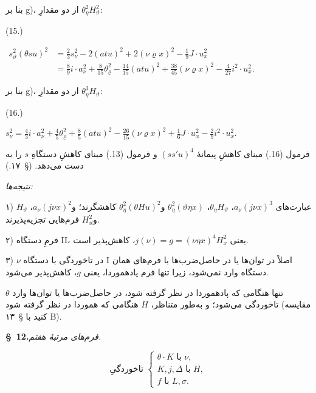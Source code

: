 \documentclass[11pt]{article}
\providecommand{\A}{\Delta}
\begin{document}
بنا بر g)، از دو مقدارِ $\theta_\eta^2H_\vartheta^2$:
\par\smallskip\noindent
\begin{minipage}[c]{3.6em}
\centering (15.)
\end{minipage}%
\begin{minipage}[c]{\dimexpr\linewidth-3.6em\relax}
\centering
\(\displaystyle
\begin{aligned}
s_\vartheta^2(\theta su)^2
&=\frac23s_\nu^2-2(atu)^2+2(\nu\varrho x)^2-\frac19J\cdot u_x^2\\
&=\frac89i\cdot a_\nu^2+\frac8{15}\theta_\varrho^2-\frac{14}{15}(atu)^2+\frac{38}{45}(\nu\varrho x)^2-\frac4{27}i^2\cdot u_x^2.
\end{aligned}
\)
\end{minipage}
\par\smallskip
بنا بر g)، از دو مقدارِ $\theta_\eta^3H_\vartheta$:
\par\smallskip\noindent
\begin{minipage}[c]{3.6em}
\centering (16.)
\end{minipage}%
\begin{minipage}[c]{\dimexpr\linewidth-3.6em\relax}
\centering
\(\displaystyle
s_\nu^2=\frac43i\cdot a_\nu^2+\frac45\theta_\varrho^2+\frac85(atu)^2-\frac{26}{15}(\nu\varrho x)^2+\frac16J\cdot u_x^2-\frac29i^2\cdot u_x^2.
\)
\end{minipage}
\par\smallskip
فرمول (16.) مبنای کاهشِ پیمانهٔ $(ss'u)^4$ و فرمول (13.) مبنای کاهشِ دستگاهِ $s$ را به دست می‌دهد. (\S\ ۱۷.)

\noindent\emph{نتیجه‌ها:}

۱) عبارت‌های $a_\nu(j\nu x)^3$، $\theta_\eta H_\vartheta$، $\theta_\eta^2(\vartheta\eta x)$ و$\theta_\eta^2(\theta Hu)^2$ کاهشگرند؛ و$a_\nu(j\nu x)^2$، $H_\vartheta$ و$H_\vartheta^2$ فرم‌هایی تجزیه‌پذیرند.

۲) فرمِ دستگاه II، یعنی $j(\nu)=g=(\nu\eta x)^4H_x^2$، کاهش‌پذیر است.

۳) $\nu$ در تاخوردگی با دستگاه I اصلاً در توان‌ها یا در حاصل‌ضرب‌ها با فرم‌های همان دستگاه وارد نمی‌شود، زیرا تنها فرم پادهموردا، یعنی $g$، کاهش‌پذیر می‌شود.

$\theta$ تنها هنگامی که پادهموردا در نظر گرفته شود، در حاصل‌ضرب‌ها یا توان‌ها وارد تاخوردگی می‌شود؛ و به‌طور متناظر، $H$ هنگامی که هموردا در نظر گرفته شود (مقایسه کنید با \S\ ۱۳ B).
\begin{center}
\textbf{\S\ 12.}\quad\emph{فرم‌های مرتبهٔ هفتم.}
\end{center}
\[
\text{تاخوردگیِ }\left\{\begin{array}{l}
\theta\cdot K\text{ با }\nu,\\
K,j,\A\text{ با }H,\\
f\text{ با }L,\sigma.
\end{array}\right.
\]
\end{document}
